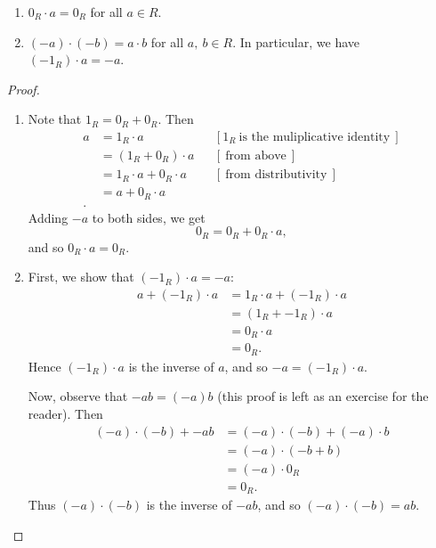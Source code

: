 \documentclass[math1530-lecture-notes]{subfiles}
\begin{document}
\begin{proposition}[]{}
  \begin{enumerate}
    \item $0_R\cdot a=0_R$ for all $a\in R$.
    \item $(-a)\cdot (-b)=a\cdot b$ for all $a,\ b\in R$. In particular, we have $(-1_R)\cdot a=-a$.
  \end{enumerate}
\end{proposition}
\begin{proof}[Proof]
  \begin{enumerate}
    \item Note that $1_R=0_R+0_R$. Then
      \begin{align*}
        a &= 1_R\cdot a && [1_R~\text{is the muliplicative identity}~]\\
          &= (1_R+0_R)\cdot a &&[~\text{from above}~]\\
          &= 1_R\cdot a+0_R\cdot a && [~\text{from distributivity}~] \\
          &= a+0_R\cdot a \\
      .\end{align*}
      Adding $-a$ to both sides, we get \[
        0_R = 0_R + 0_R\cdot a
      ,\] and so $0_R \cdot a=0_R$.

    \item First, we show that $(-1_R)\cdot a=-a$:
      \begin{align*}
        a + (-1_R)\cdot a&= 1_R\cdot a+(-1_R)\cdot a \\
                         &= (1_R+ -1_R)\cdot a \\
                         &= 0_R\cdot a \\
                         &= 0_R
       .\end{align*}
       Hence $(-1_R)\cdot a$ is the inverse of $a$, and so $-a=(-1_R)\cdot a$.

       Now, observe that $-ab = (-a)b$ (this proof is left as an exercise for the reader). Then
       \begin{align*}
         (-a)\cdot (-b) + -ab &= (-a)\cdot (-b) + (-a)\cdot b \\
                              &= (-a)\cdot (-b+b) \\
                              &= (-a)\cdot 0_R \\
                              &= 0_R
      .\end{align*}
      Thus $(-a)\cdot (-b)$ is the inverse of $-ab$, and so $(-a)\cdot (-b)=ab$.
  \end{enumerate}
\end{proof}
\end{document}
